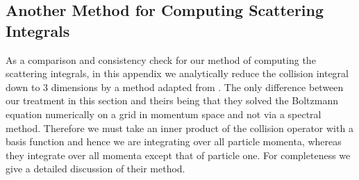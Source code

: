 \subsection{Another Method for Computing Scattering Integrals}\label{app:dogov_method}
As a comparison and consistency check for our method of computing the scattering integrals, in this appendix we analytically reduce the collision integral down to $3$ dimensions by a method adapted from \cite{Dolgov_Hansen}.  The only difference between our treatment in this section and theirs being that they solved the Boltzmann equation numerically on a grid in momentum space and not via a spectral method.  Therefore we must take an inner product of the collision operator with a basis function and hence we are integrating over all particle momenta, whereas they integrate over all momenta except that of particle one.  For completeness we give a detailed discussion of their method.

